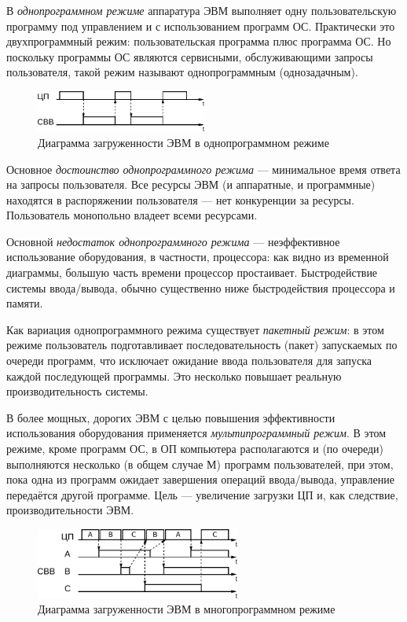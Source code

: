 \documentclass[unicode, 12pt, a4paper, oneside]{article}
\begin{document}
В \textit{однопрограммном режиме} аппаратура ЭВМ выполняет одну пользовательскую программу под управлением и с использованием программ ОС. Практически это двухпрограммный режим: пользовательская программа плюс программа ОС. Но поскольку программы ОС являются сервисными, обслуживающими запросы пользователя, такой режим называют однопрограммным (однозадачным).

\begin{figure}[H]
\centering
\includegraphics[width=0.5\textwidth]{153_single.pdf}
\caption{Диаграмма загруженности ЭВМ в однопрограммном режиме}
\end{figure}

Основное \textit{достоинство однопрограммного режима} --- минимальное время ответа на запросы пользователя. Все ресурсы ЭВМ (и аппаратные, и программные) находятся в распоряжении пользователя --- нет конкуренции за ресурсы. Пользователь монопольно владеет всеми ресурсами.

Основной \textit{недостаток однопрограммного режима} --- неэффективное использование оборудования, в частности, процессора: как видно из временной диаграммы, большую часть времени процессор простаивает.  Быстродействие системы ввода/вывода, обычно существенно ниже быстродействия процессора и памяти.

Как вариация однопрограммного режима существует \textit{пакетный режим}: в этом режиме пользователь подготавливает последовательность (пакет) запускаемых по очереди программ, что исключает ожидание ввода пользователя для запуска каждой последующей программы. Это несколько повышает реальную производительность системы.

В более мощных, дорогих ЭВМ с целью повышения эффективности использования оборудования применяется \textit{мультипрограммный режим}. В этом режиме, кроме программ ОС, в ОП компьютера располагаются и (по очереди) выполняются несколько (в общем случае М) программ пользователей, при этом, пока одна из программ ожидает завершения операций ввода/вывода, управление передаётся другой программе. Цель --- увеличение загрузки ЦП и, как следствие, производительности ЭВМ.

\begin{figure}[H]
\centering
\includegraphics[width=0.6\textwidth]{153_multi.pdf}
\caption{Диаграмма загруженности ЭВМ в многопрограммном режиме}
\end{figure}
\end{document}
